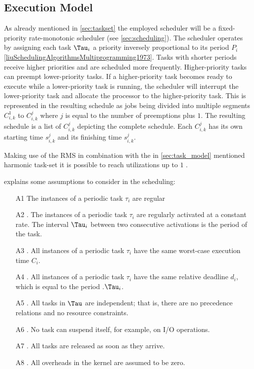 \subsection{Execution Model}\label{sec:execution_model}
As already mentioned in \cref{sec:taskset} the employed scheduler will be a fixed-priority rate-monotonic scheduler (see \cref{sec:scheduling}).
The scheduler operates by assigning each task $\Tau_i$ a priority inversely proportional to its period $P_i$ \ref{liuSchedulingAlgorithmsMultiprogramming1973}.
Tasks with shorter periods receive higher priorities and are scheduled more frequently.
Higher-priority tasks can preempt lower-priority tasks.
If a higher-priority task becomes ready to execute while a lower-priority task is running, the scheduler will interrupt the lower-priority task and allocate the processor to the higher-priority task.
This is represented in the resulting schedule as jobs being divided into multiple segments $C_{i,k}^1$ to $C_{i,k}^j$ where $j$ is equal to the number of preemptions plus $1$.
The resulting schedule is a list of $C_{i,k}^j$ depicting the complete schedule.
Each $C_{i,k}^j$ has its own starting time $s_{i,k}^j$ and its finishing time $s_{i,k}^j$.


Making use of the \ac{RMS} in combination with the in \cref{sec:task_model} mentioned harmonic task-set it is possible to reach utilizations up to $1$ \cite{liuSchedulingAlgorithmsMultiprogramming1973}.

\textcite[p. 70f]{buttazzoHardRealTimeComputing2024} explains some assumptions to consider in the scheduling:
\begin{enumerate}
	\item[A1] The instances of a periodic task $\tau_i$ are regular
	\item[A2]. The instances of a periodic task $\tau_i$ are regularly activated at a constant rate. The interval $\Tau_i$ between two consecutive activations is the period of the task. 
	\item[A3]. All instances of a periodic task $\tau_i$ have the same worst-case execution time $C_i$.
	\item[A4]. All instances of a periodic task $\tau_i$ have the same relative deadline $d_i$, which is equal to the period .$\Tau_i$. 
	\item[A5]. All tasks in $\Tau$ are independent; that is, there are no precedence relations and no resource constraints.
	\item[A6]. No task can suspend itself, for example, on I/O operations. 
	\item[A7]. All tasks are released as soon as they arrive. 
	\item[A8]. All overheads in the kernel are assumed to be zero. 
\end{enumerate}

